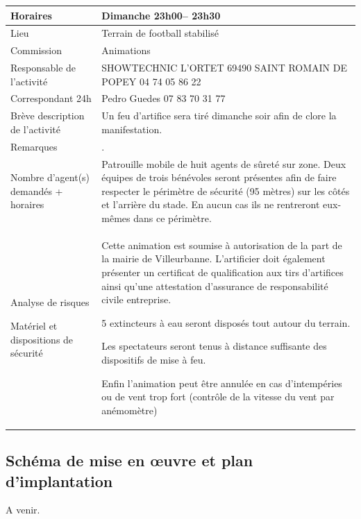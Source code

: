 \documentclass[hidelinks, paper=a4, fontsize=13pt]{report}
\begin{document}
\begin{tabular}{ | p{6cm} | p{10cm} | }
\hline
	Horaires & Dimanche 23h00– 23h30 \\ \hline
	Lieu & Terrain de football stabilisé \\ \hline
	Commission & Animations \\ \hline
	Responsable de l'activité & SHOWTECHNIC 
L'ORTET 
69490 SAINT ROMAIN DE POPEY
04 74 05 86 22 \\ \hline

	Correspondant 24h & Pedro Guedes 07 83 70 31 77 \\ \hline

	Brève description de l'activité & Un feu d’artifice sera tiré dimanche soir afin de clore la manifestation. \\ \hline

	Remarques & . \\ \hline
	Nombre d’agent(s) demandés + horaires
 & Patrouille mobile de huit agents de sûreté sur zone.
Deux équipes de trois bénévoles seront présentes afin de faire respecter le périmètre de sécurité (95 mètres) sur les côtés et l’arrière du stade. En aucun cas ils ne rentreront eux-mêmes dans ce périmètre. \\ \hline
	Analyse de risques

Matériel et dispositions de sécurité & Cette animation est soumise à autorisation de la part de la mairie de Villeurbanne. L’artificier doit également présenter un certificat de qualification aux tirs d’artifices ainsi qu’une attestation d’assurance de responsabilité civile entreprise.

5 extincteurs à eau seront disposés tout autour du terrain.

Les spectateurs seront tenus à distance suffisante des dispositifs de mise à feu.

Enfin l’animation peut être annulée en cas d’intempéries ou de vent trop fort (contrôle de la vitesse du vent par anémomètre) \\ \hline
\end{tabular}


\subsection{Schéma de mise en œuvre et plan d’implantation}
A venir.
\end{document}
